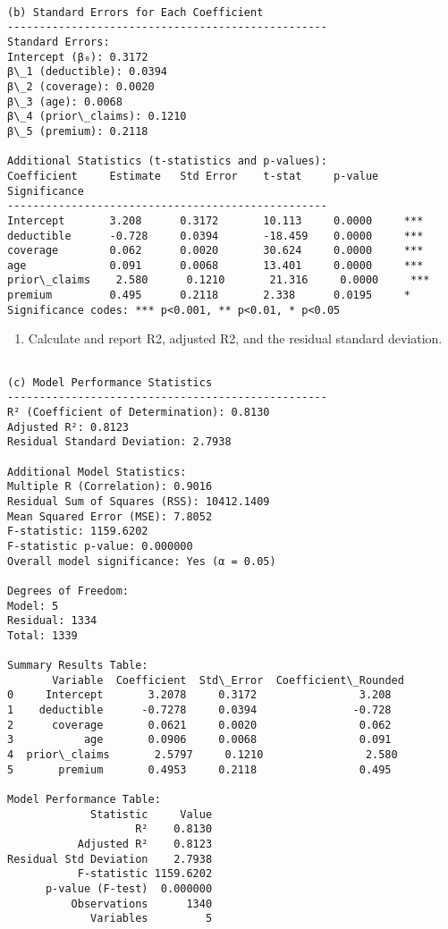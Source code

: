 \documentclass[8pt, twocolumn]{extarticle}
\providecommand{\tightlist}{%
      \setlength{\itemsep}{0pt}\setlength{\parskip}{0pt}}
\begin{document}
    \begin{Verbatim}[commandchars=\\\{\}]

(b) Standard Errors for Each Coefficient
--------------------------------------------------
Standard Errors:
Intercept (β₀): 0.3172
β\_1 (deductible): 0.0394
β\_2 (coverage): 0.0020
β\_3 (age): 0.0068
β\_4 (prior\_claims): 0.1210
β\_5 (premium): 0.2118

Additional Statistics (t-statistics and p-values):
Coefficient     Estimate   Std Error    t-stat     p-value    Significance
--------------------------------------------------
Intercept       3.208      0.3172       10.113     0.0000     ***
deductible      -0.728     0.0394       -18.459    0.0000     ***
coverage        0.062      0.0020       30.624     0.0000     ***
age             0.091      0.0068       13.401     0.0000     ***
prior\_claims    2.580      0.1210       21.316     0.0000     ***
premium         0.495      0.2118       2.338      0.0195     *
Significance codes: *** p<0.001, ** p<0.01, * p<0.05
    \end{Verbatim}

    \begin{enumerate}
\def\labelenumi{(\alph{enumi})}
\setcounter{enumi}{2}
\tightlist
\item
  Calculate and report R2, adjusted R2, and the residual standard
  deviation.
\end{enumerate}

    \begin{Verbatim}[commandchars=\\\{\}]

(c) Model Performance Statistics
--------------------------------------------------
R² (Coefficient of Determination): 0.8130
Adjusted R²: 0.8123
Residual Standard Deviation: 2.7938

Additional Model Statistics:
Multiple R (Correlation): 0.9016
Residual Sum of Squares (RSS): 10412.1409
Mean Squared Error (MSE): 7.8052
F-statistic: 1159.6202
F-statistic p-value: 0.000000
Overall model significance: Yes (α = 0.05)

Degrees of Freedom:
Model: 5
Residual: 1334
Total: 1339

Summary Results Table:
       Variable  Coefficient  Std\_Error  Coefficient\_Rounded
0     Intercept       3.2078     0.3172                3.208
1    deductible      -0.7278     0.0394               -0.728
2      coverage       0.0621     0.0020                0.062
3           age       0.0906     0.0068                0.091
4  prior\_claims       2.5797     0.1210                2.580
5       premium       0.4953     0.2118                0.495

Model Performance Table:
             Statistic     Value
                    R²    0.8130
           Adjusted R²    0.8123
Residual Std Deviation    2.7938
           F-statistic 1159.6202
      p-value (F-test)  0.000000
          Observations      1340
             Variables         5
    \end{Verbatim}
\end{document}

